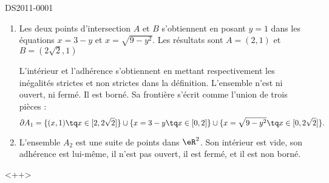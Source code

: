 \begin{corrige}{DS2011-0001}
  
    \begin{enumerate}
        \item
            


    \begin{center}
   
    \end{center}


    Les deux points d'intersection \( A\) et \( B\) s'obtiennent en posant \( y=1\) dans les équations \( x=3-y\) et \( x=\sqrt{9-y^2}\). Les résultats sont \( A=(2,1)\) et \( B=(2\sqrt{2},1)\)

    L'intérieur et l'adhérence s'obtiennent en mettant respectivement les inégalités strictes et non strictes dans la définition. L'ensemble n'est ni ouvert, ni fermé. Il est borné. Sa frontière s'écrit comme l'union de trois pièces :
    \begin{equation}
        \partial A_1=\{ (x,1)\tq x\in\mathopen[ 2,2\sqrt{2}  \mathclose] \}\cup\{ x=3-y\tq x\in\mathopen[ 0 , 2 \mathclose] \}\cup\{ x=\sqrt{9-y^2}\tq x\in\mathopen[ 0 , 2\sqrt{2} \mathclose] \}.
    \end{equation}

\item

    L'ensemble \( A_2\) est une suite de points dans \( \eR^2\). Son intérieur est vide, son adhérence est lui-même, il n'est pas ouvert, il est fermé, et il est non borné.
    \end{enumerate}
    <++>

\end{corrige}

